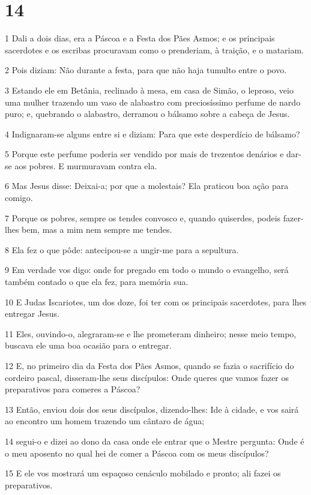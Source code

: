 \chapter{14}

\par 1 Dali a dois dias, era a Páscoa e a Festa dos Pães Asmos; e os principais sacerdotes e os escribas procuravam como o prenderiam, à traição, e o matariam.
\par 2 Pois diziam: Não durante a festa, para que não haja tumulto entre o povo.
\par 3 Estando ele em Betânia, reclinado à mesa, em casa de Simão, o leproso, veio uma mulher trazendo um vaso de alabastro com preciosíssimo perfume de nardo puro; e, quebrando o alabastro, derramou o bálsamo sobre a cabeça de Jesus.
\par 4 Indignaram-se alguns entre si e diziam: Para que este desperdício de bálsamo?
\par 5 Porque este perfume poderia ser vendido por mais de trezentos denários e dar-se aos pobres. E murmuravam contra ela.
\par 6 Mas Jesus disse: Deixai-a; por que a molestais? Ela praticou boa ação para comigo.
\par 7 Porque os pobres, sempre os tendes convosco e, quando quiserdes, podeis fazer-lhes bem, mas a mim nem sempre me tendes.
\par 8 Ela fez o que pôde: antecipou-se a ungir-me para a sepultura.
\par 9 Em verdade vos digo: onde for pregado em todo o mundo o evangelho, será também contado o que ela fez, para memória sua.
\par 10 E Judas Iscariotes, um dos doze, foi ter com os principais sacerdotes, para lhes entregar Jesus.
\par 11 Eles, ouvindo-o, alegraram-se e lhe prometeram dinheiro; nesse meio tempo, buscava ele uma boa ocasião para o entregar.
\par 12 E, no primeiro dia da Festa dos Pães Asmos, quando se fazia o sacrifício do cordeiro pascal, disseram-lhe seus discípulos: Onde queres que vamos fazer os preparativos para comeres a Páscoa?
\par 13 Então, enviou dois dos seus discípulos, dizendo-lhes: Ide à cidade, e vos sairá ao encontro um homem trazendo um cântaro de água;
\par 14 segui-o e dizei ao dono da casa onde ele entrar que o Mestre pergunta: Onde é o meu aposento no qual hei de comer a Páscoa com os meus discípulos?
\par 15 E ele vos mostrará um espaçoso cenáculo mobilado e pronto; ali fazei os preparativos.
